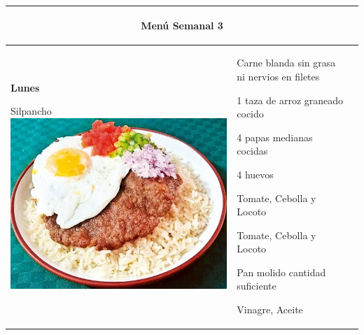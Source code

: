 \documentclass[menu.tex]{subfiles}
\begin{document}
    
    \begin{tabular} {p{3.5cm} p{4cm} p{9cm}}
        \multicolumn{3}{c}{\begin{LARGE}Menú Semanal 3\end{LARGE}}\\
        \hline
    
        \pbox{20cm}
        {
            \rule{0pt}{3ex}\begin{large}\textbf{Lunes}\end{large}\\ 
            \rule{0pt}{2ex}Silpancho \\
            \includegraphics[scale=0.25]{Silpancho} 
        } & 
        \vspace{-1.8cm}
        \begin{compactitem} 
            \begin{footnotesize}
                \item Carne blanda sin grasa ni nervios en filetes
                \item 1 taza de arroz graneado cocido
                \item 4 papas medianas cocidas
                \item 4 huevos
                \item Tomate, Cebolla y Locoto
                \item Tomate, Cebolla y Locoto
                \item Pan molido cantidad suficiente
                \item Vinagre, Aceite

\end{footnotesize}
\end{compactitem}
\end{tabular}
\end{document}
